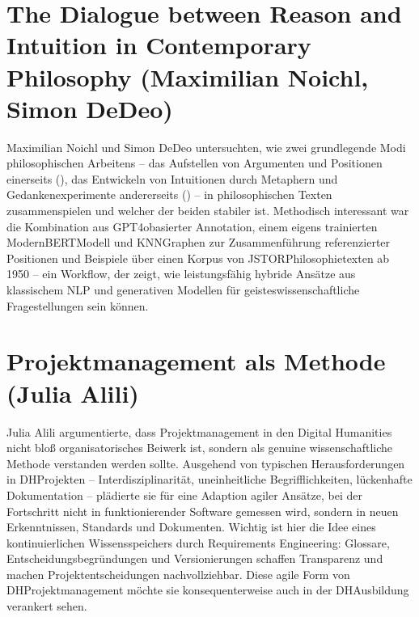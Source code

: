 \documentclass[letterpaper,10pt,english]{jupyterBook}
\begin{document}
\section{The Dialogue between Reason and Intuition in Contemporary Philosophy (Maximilian Noichl, Simon DeDeo)}
\label{\detokenize{tagung/anderes:the-dialogue-between-reason-and-intuition-in-contemporary-philosophy-maximilian-noichl-simon-dedeo}}
\sphinxAtStartPar
Maximilian Noichl und Simon DeDeo untersuchten, wie zwei grundlegende Modi philosophischen Arbeitens – das Aufstellen von Argumenten und Positionen einerseits (), das Entwickeln von Intuitionen durch Metaphern und Gedankenexperimente andererseits () – in philosophischen Texten zusammenspielen und welcher der beiden stabiler ist. Methodisch interessant war die Kombination aus GPT\sphinxhyphen{}4o\sphinxhyphen{}basierter Annotation, einem eigens trainierten ModernBERT\sphinxhyphen{}Modell und KNN\sphinxhyphen{}Graphen zur Zusammenführung referenzierter Positionen und Beispiele über einen Korpus von JSTOR\sphinxhyphen{}Philosophietexten ab 1950 – ein Workflow, der zeigt, wie leistungsfähig hybride Ansätze aus klassischem NLP und generativen Modellen für geisteswissenschaftliche Fragestellungen sein können.


\section{Projektmanagement als Methode (Julia Alili)}
\label{\detokenize{tagung/anderes:projektmanagement-als-methode-julia-alili}}
\sphinxAtStartPar
Julia Alili argumentierte, dass Projektmanagement in den Digital Humanities nicht bloß organisatorisches Beiwerk ist, sondern als genuine wissenschaftliche Methode verstanden werden sollte. Ausgehend von typischen Herausforderungen in DH\sphinxhyphen{}Projekten – Interdisziplinarität, uneinheitliche Begrifflichkeiten, lückenhafte Dokumentation – plädierte sie für eine Adaption agiler Ansätze, bei der Fortschritt nicht in funktionierender Software gemessen wird, sondern in neuen Erkenntnissen, Standards und Dokumenten. Wichtig ist hier die Idee eines kontinuierlichen Wissensspeichers durch Requirements Engineering: Glossare, Entscheidungsbegründungen und Versionierungen schaffen Transparenz und machen Projektentscheidungen nachvollziehbar. Diese agile Form von DH\sphinxhyphen{}Projektmanagement möchte sie konsequenterweise auch in der DH\sphinxhyphen{}Ausbildung verankert sehen.

\sphinxstepscope
\end{document}
